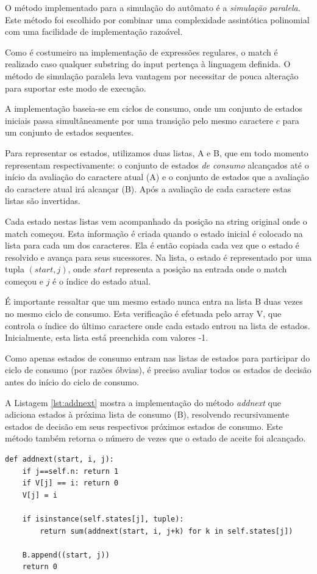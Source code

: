 \documentclass[a4paper,12pt,oneside,onecolumn]{uerj}
\begin{document}
O método implementado para a simulação do autômato é a \emph{simulação paralela}. Este método foi escolhido por combinar uma complexidade assintótica polinomial com uma facilidade de implementação razoável.

Como é costumeiro na implementação de expressões regulares, o match é realizado caso qualquer substring do input pertença à linguagem definida. O método de simulação paralela leva vantagem por necessitar de pouca alteração para suportar este modo de execução.

A implementação baseia-se em ciclos de consumo, onde um conjunto de estados iniciais passa simultâneamente por uma transição pelo mesmo caractere $c$ para um conjunto de estados sequentes.

Para representar os estados, utilizamos duas listas, A e B, que em todo momento representam respectivamente: o conjunto de estados \emph{de consumo} alcançados até o início da avaliação do caractere atual (A) e o conjunto de estados que a avaliação do caractere atual irá alcançar (B). Após a avaliação de cada caractere estas listas são invertidas. 

Cada estado nestas listas vem acompanhado da posição na string original onde o match começou. Esta informação é criada quando o estado inicial é colocado na lista para cada um dos caracteres. Ela é então copiada cada vez que o estado é resolvido e avança para seus sucessores. Na lista, o estado é representado por uma tupla $(start, j)$, onde $start$ representa a posição na entrada onde o match começou e $j$ é o índice do estado atual.

É importante ressaltar que um mesmo estado nunca entra na lista B duas vezes no mesmo ciclo de consumo. Esta verificação é efetuada pelo array V, que controla o índice do último caractere onde cada estado entrou na lista de estados. Inicialmente, esta lista está preenchida com valores -1.

Como apenas estados de consumo entram nas listas de estados para participar do ciclo de consumo (por razões óbvias), é preciso avaliar todos os estados de decisão antes do início do ciclo de consumo. 

A Listagem \ref{lst:addnext} mostra a implementação do método \emph{addnext} que adiciona estados à próxima lista de consumo (B), resolvendo recursivamente estados de decisão em seus respectivos próximos estados de consumo. Este método também retorna o número de vezes que o estado de aceite foi alcançado.

\vspace{0.5cm}
\begin{lstlisting}[caption={Implementação do método \emph{addnext}},label=lst:addnext]
def addnext(start, i, j):
    if j==self.n: return 1
    if V[j] == i: return 0
    V[j] = i

    if isinstance(self.states[j], tuple):
        return sum(addnext(start, i, j+k) for k in self.states[j])

    B.append((start, j))
    return 0
\end{lstlisting}
\end{document}
